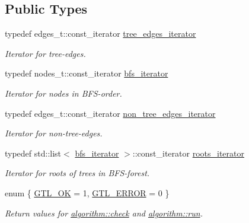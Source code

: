 \subsection*{Public Types}
\begin{DoxyCompactItemize}
\item 
typedef edges\+\_\+t\+::const\+\_\+iterator \mbox{\hyperlink{classbfs_a04e608fe18089e5495cadb995aa75261}{tree\+\_\+edges\+\_\+iterator}}
\begin{DoxyCompactList}\small\item\em Iterator for tree-\/edges. \end{DoxyCompactList}\item 
typedef nodes\+\_\+t\+::const\+\_\+iterator \mbox{\hyperlink{classbfs_a1035f068a96de0370789ec315aef4f73}{bfs\+\_\+iterator}}
\begin{DoxyCompactList}\small\item\em Iterator for nodes in B\+F\+S-\/order. \end{DoxyCompactList}\item 
typedef edges\+\_\+t\+::const\+\_\+iterator \mbox{\hyperlink{classbfs_a89ec32919076618d9eef18990fef543f}{non\+\_\+tree\+\_\+edges\+\_\+iterator}}
\begin{DoxyCompactList}\small\item\em Iterator for non-\/tree-\/edges. \end{DoxyCompactList}\item 
typedef std\+::list$<$ \mbox{\hyperlink{classbfs_a1035f068a96de0370789ec315aef4f73}{bfs\+\_\+iterator}} $>$\+::const\+\_\+iterator \mbox{\hyperlink{classbfs_a70b915179053a2993154614d4358fdc1}{roots\+\_\+iterator}}
\begin{DoxyCompactList}\small\item\em Iterator for roots of trees in B\+F\+S-\/forest. \end{DoxyCompactList}\item 
enum \{ \mbox{\hyperlink{classalgorithm_af1a0078e153aa99c24f9bdf0d97f6710a5114c20e4a96a76b5de9f28bf15e282b}{G\+T\+L\+\_\+\+OK}} = 1, 
\mbox{\hyperlink{classalgorithm_af1a0078e153aa99c24f9bdf0d97f6710a6fcf574690bbd6cf710837a169510dd7}{G\+T\+L\+\_\+\+E\+R\+R\+OR}} = 0
 \}
\begin{DoxyCompactList}\small\item\em Return values for \mbox{\hyperlink{classalgorithm_a76361fb03ad1cf643affc51821e43bed}{algorithm\+::check}} and \mbox{\hyperlink{classalgorithm_a734b189509a8d6b56b65f8ff772d43ca}{algorithm\+::run}}. \end{DoxyCompactList}\end{DoxyCompactItemize}
